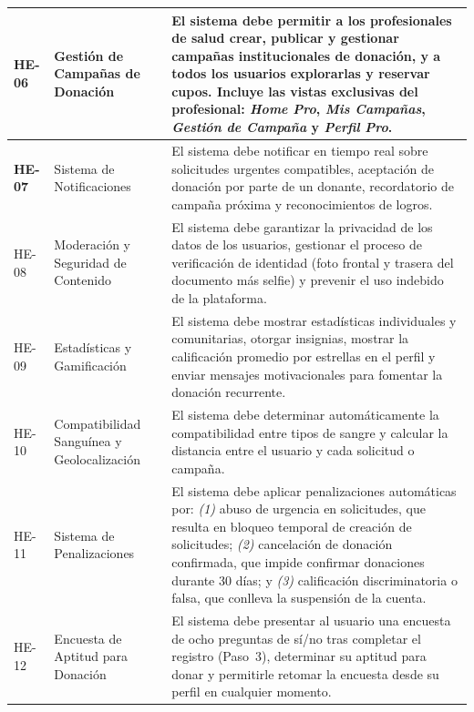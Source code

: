 \begin{longtable}{%
  |>{\bfseries\centering\arraybackslash}p{1.6cm}%
  |>{\raggedright\arraybackslash}p{4.2cm}%
  |>{\raggedright\arraybackslash}p{9.0cm}|}
HE-06 &
Gestión de Campañas de Donación &
El sistema debe permitir a los profesionales de salud crear, publicar y gestionar campañas
institucionales de donación, y a todos los usuarios explorarlas y reservar cupos. Incluye
las vistas exclusivas del profesional: \textit{Home Pro}, \textit{Mis Campañas},
\textit{Gestión de Campaña} y \textit{Perfil Pro}. \\
\hline

HE-07 &
Sistema de Notificaciones &
El sistema debe notificar en tiempo real sobre solicitudes urgentes compatibles, aceptación
de donación por parte de un donante, recordatorio de campaña próxima y reconocimientos de
logros. \\
\hline

HE-08 &
Moderación y Seguridad de Contenido &
El sistema debe garantizar la privacidad de los datos de los usuarios, gestionar el proceso
de verificación de identidad (foto frontal y trasera del documento más selfie) y prevenir
el uso indebido de la plataforma. \\
\hline

HE-09 &
Estadísticas y Gamificación &
El sistema debe mostrar estadísticas individuales y comunitarias, otorgar insignias,
mostrar la calificación promedio por estrellas en el perfil y enviar mensajes
motivacionales para fomentar la donación recurrente. \\
\hline

HE-10 &
Compatibilidad Sanguínea y Geolocalización &
El sistema debe determinar automáticamente la compatibilidad entre tipos de sangre y
calcular la distancia entre el usuario y cada solicitud o campaña. \\
\hline

HE-11 &
Sistema de Penalizaciones &
El sistema debe aplicar penalizaciones automáticas por: \textit{(1)} abuso de urgencia en
solicitudes, que resulta en bloqueo temporal de creación de solicitudes; \textit{(2)}
cancelación de donación confirmada, que impide confirmar donaciones durante 30 días; y
\textit{(3)} calificación discriminatoria o falsa, que conlleva la suspensión de la cuenta. \\
\hline

HE-12 &
Encuesta de Aptitud para Donación &
El sistema debe presentar al usuario una encuesta de ocho preguntas de sí/no tras completar
el registro (Paso~3), determinar su aptitud para donar y permitirle retomar la encuesta
desde su perfil en cualquier momento. \\
\hline

\end{longtable}

